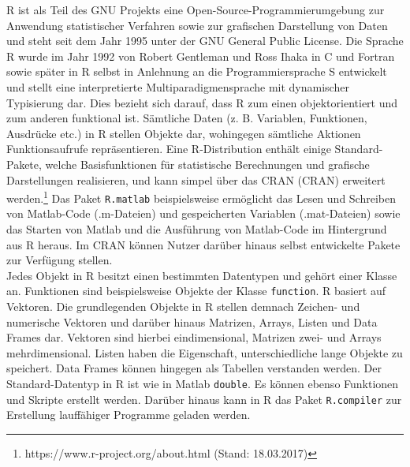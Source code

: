 R ist als Teil des GNU Projekts eine Open-Source-Programmierumgebung zur Anwendung statistischer Verfahren sowie zur grafischen Darstellung von Daten und steht seit dem Jahr 1995 unter der GNU General Public License. Die Sprache R wurde im Jahr 1992 von Robert Gentleman und Ross Ihaka in C und Fortran sowie später in R selbst in Anlehnung an die Programmiersprache S entwickelt und stellt eine interpretierte Multiparadigmensprache mit dynamischer Typisierung dar. Dies bezieht sich darauf, dass R zum einen objektorientiert und zum anderen funktional ist. Sämtliche Daten (z. B. Variablen, Funktionen, Ausdrücke etc.) in R stellen Objekte dar, wohingegen sämtliche Aktionen Funktionsaufrufe repräsentieren. Eine R-Distribution enthält einige Standard-Pakete, welche Basisfunktionen für statistische Berechnungen und grafische Darstellungen realisieren, und kann simpel über das \acl{CRAN} (\acs{CRAN}) erweitert werden.\footnote{https://www.r-project.org/about.html (Stand: 18.03.2017)} Das Paket \texttt{R.matlab} beispielsweise ermöglicht das Lesen und Schreiben von Matlab-Code (.m-Dateien) und gespeicherten Variablen (.mat-Dateien) sowie das Starten von Matlab und die Ausführung von Matlab-Code im Hintergrund aus R heraus. Im \acs{CRAN} können Nutzer darüber hinaus selbst entwickelte Pakete zur Verfügung stellen. \parencite{adler_r_2012, manderscheid_sozialwissenschaftliche_2012}\\

Jedes Objekt in R besitzt einen bestimmten Datentypen und gehört einer Klasse an. Funktionen sind beispielsweise Objekte der Klasse \texttt{function}. R basiert auf Vektoren. Die grundlegenden Objekte in R stellen demnach Zeichen- und numerische Vektoren und darüber hinaus Matrizen, Arrays, Listen und Data Frames dar. Vektoren sind hierbei eindimensional, Matrizen zwei- und Arrays mehrdimensional. Listen haben die Eigenschaft, unterschiedliche lange Objekte zu speichert. Data Frames können hingegen als Tabellen verstanden werden. Der Standard-Datentyp in R ist wie in Matlab \texttt{double}. Es können ebenso Funktionen und Skripte erstellt werden. Darüber hinaus kann in R das Paket \texttt{R.compiler} zur Erstellung lauffähiger Programme geladen werden. \parencite{adler_r_2012, manderscheid_sozialwissenschaftliche_2012}\\

